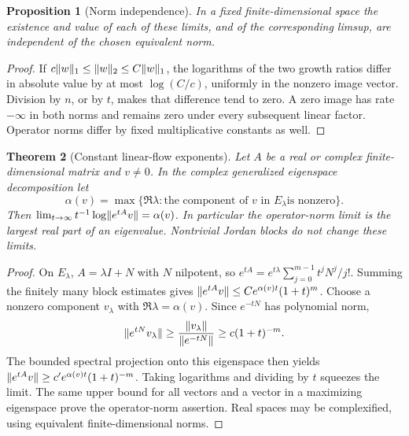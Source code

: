 \documentclass[11pt,oneside]{book}
\newtheorem{theorem}{Theorem}[chapter]
\newtheorem{proposition}[theorem]{Proposition}
\theoremstyle{definition}
\theoremstyle{remark}\newtheorem{remark}[theorem]{Remark}
\begin{document}
\begin{proposition}[Norm independence]\label{d13:18:norm-independence}
In a fixed finite-dimensional space the existence and value of each
of these limits, and of the corresponding limsup, are independent
of the chosen equivalent norm.
\end{proposition}
\begin{proof}
If \(c\lVert w\rVert_1\leq\lVert w\rVert_2\leq C\lVert w\rVert_1\), the logarithms of
the two growth ratios differ in absolute value by at most
\(\log(C/c)\), uniformly in the nonzero image vector.
Division by \(n\), or by \(t\), makes that difference tend to zero.
A zero image has rate \(-\infty\) in both norms and remains zero
under every subsequent linear factor. Operator norms differ by
fixed multiplicative constants as well.
\end{proof}

\begin{theorem}[Constant linear-flow exponents]\label{d13:18:linear-exponents}
Let \(A\) be a real or complex finite-dimensional matrix and \(v\neq0\).
In the complex generalized eigenspace decomposition let
\[
 \alpha(v)=\max\{\Re\lambda:\text{the component of \(v\) in \(E_\lambda\)
                                        is nonzero}\}.
\]
Then
\(\lim_{t\to\infty}t^{-1}\log\lVert e^{tA}v\rVert=\alpha(v)\).
In particular the operator-norm limit is the largest real part of
an eigenvalue. Nontrivial Jordan blocks do not change these limits.
\end{theorem}
\begin{proof}
On \(E_\lambda\), \(A=\lambda I+N\) with \(N\) nilpotent, so
\(e^{tA}=e^{t\lambda}\sum_{j=0}^{m-1}t^jN^j/j!\).
Summing the finitely many block estimates gives
\(\lVert e^{tA}v\rVert\leq C e^{\alpha(v)t}(1+t)^m\).
Choose a nonzero component \(v_\lambda\) with
\(\Re\lambda=\alpha(v)\). Since \(e^{-tN}\) has polynomial norm,
\[
 \lVert e^{tN}v_\lambda\rVert
 \geq\frac{\lVert v_\lambda\rVert}{\lVert e^{-tN}\rVert}
 \geq c(1+t)^{-m}.
\]
The bounded spectral projection onto this eigenspace then yields
\(\lVert e^{tA}v\rVert\geq c'e^{\alpha(v)t}(1+t)^{-m}\).
Taking logarithms and dividing by \(t\) squeezes the limit.
The same upper bound for all vectors and a vector in a maximizing
eigenspace prove the operator-norm assertion. Real spaces may be
complexified, using equivalent finite-dimensional norms.
\end{proof}
\end{document}
